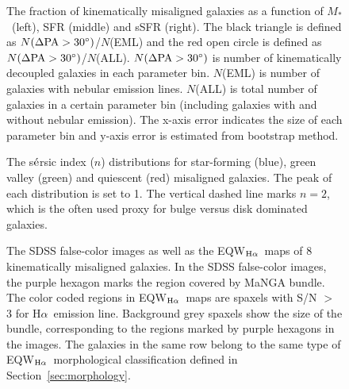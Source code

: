 \documentclass[a4paper,fleqn,usenatbib]{mnras}
\newcommand{\mstar}{$M_*$}
\newcommand{\ha}{H$\alpha$}
\newcommand{\ewhae}{\rm{EQW$_{\rm H\alpha}$}}
\begin{document}
\begin{figure}
  \begin{center}
    
  \end{center}
   \caption{The fraction of kinematically misaligned galaxies as a function of \mstar\ (left), SFR (middle) and sSFR (right). The black triangle is defined as $N(\rm \Delta PA > 30^\circ)$/$N$(EML) and the red open circle is defined as $N(\rm \Delta PA > 30^\circ)$/$N$(ALL). $N(\rm \Delta PA > 30^\circ)$ is number of kinematically decoupled galaxies in each parameter bin. $N$(EML) is number of galaxies with nebular emission lines. $N$(ALL) is total number of galaxies in a certain parameter bin (including galaxies with and without nebular emission). The x-axis error indicates the size of each parameter bin and y-axis error is estimated from bootstrap method.}
  \label{fig:fraction}
\end{figure}

\begin{figure}
  \begin{center}
    
  \end{center}
  \caption{The s$\acute{\rm e}$rsic index ($n$) distributions for star-forming (blue), green valley (green) and quiescent (red) misaligned galaxies. The peak of each distribution is set to 1. The vertical dashed line marks $n=2$, which is the often used proxy for bulge versus disk dominated galaxies.}
  \label{fig:sersic}
\end{figure}

\begin{figure}
  \begin{center}
    
  \end{center}
  \caption{The SDSS false-color images as well as the \ewhae\ maps of 8 kinematically misaligned galaxies. In the SDSS false-color images, the purple hexagon marks the region covered by MaNGA bundle. The color coded regions in \ewhae\ maps are spaxels with S/N $>$ 3 for \ha\ emission line. Background grey spaxels show the size of the bundle, corresponding to the regions marked by purple hexagons in the images. The galaxies in the same row belong to the same type of \ewhae\ morphological classification defined in Section~\ref{sec:morphology}.}
  \label{fig:morph}
\end{figure}
\end{document}
